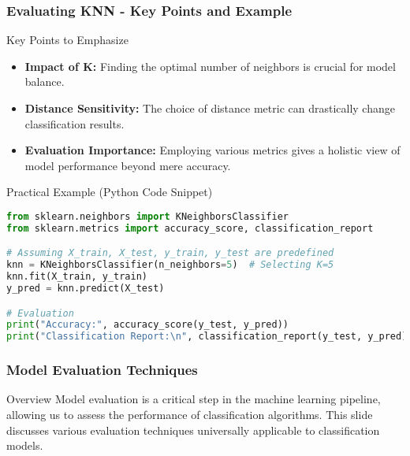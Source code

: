 \documentclass[aspectratio=169]{beamer}
\begin{document}
\begin{frame}[fragile]
  \frametitle{Evaluating KNN - Key Points and Example}
  \begin{block}{Key Points to Emphasize}
    \begin{itemize}
      \item \textbf{Impact of K:} Finding the optimal number of neighbors is crucial for model balance.
      \item \textbf{Distance Sensitivity:} The choice of distance metric can drastically change classification results.
      \item \textbf{Evaluation Importance:} Employing various metrics gives a holistic view of model performance beyond mere accuracy.
    \end{itemize}
  \end{block}

  \begin{block}{Practical Example (Python Code Snippet)}
  \begin{lstlisting}[language=Python]
from sklearn.neighbors import KNeighborsClassifier
from sklearn.metrics import accuracy_score, classification_report

# Assuming X_train, X_test, y_train, y_test are predefined
knn = KNeighborsClassifier(n_neighbors=5)  # Selecting K=5
knn.fit(X_train, y_train)
y_pred = knn.predict(X_test)

# Evaluation
print("Accuracy:", accuracy_score(y_test, y_pred))
print("Classification Report:\n", classification_report(y_test, y_pred))
  \end{lstlisting}
  \end{block}
\end{frame}

\begin{frame}[fragile]
    \frametitle{Model Evaluation Techniques}
    \begin{block}{Overview}
        Model evaluation is a critical step in the machine learning pipeline, allowing us to assess the performance of classification algorithms. This slide discusses various evaluation techniques universally applicable to classification models.
    \end{block}
\end{frame}
\end{document}
